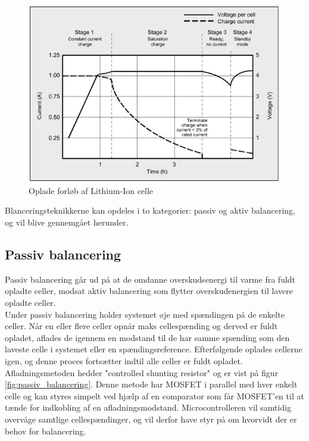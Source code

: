 \begin{figure}[h]
	\centering
	\includegraphics[width=15cm]{billeder/liion_opladning.png}
	\caption{Oplade forløb af Lithium-Ion celle}
	\label{fig:opladning_liion}
\end{figure}

Blanceringsteknikkerne kan opdeles i to kategorier: passiv og aktiv balancering, og vil blive gennemgået herunder.

\subsection{Passiv balancering}
Passiv balancering går ud på at de omdanne overskudsenergi til varme fra fuldt opladte celler, modsat aktiv balancering som flytter overskudenergien til lavere opladte celler.
\\

Under passiv balancering holder systemet øje med spændingen på de enkelte celler. Når en eller flere celler opnår maks cellespænding og derved er fuldt opladet, aflades de igennem en modstand til de har samme spænding som den laveste celle i systemet eller en spændingsreference. Efterfølgende oplades cellerne igen, og denne proces fortsætter indtil alle celler er fuldt opladet. 
\\

Afladningsmetoden hedder "controlled shunting resistor" og er vist på figur \ref{fig:passiv_balancering}. Denne metode har MOSFET i parallel med hver enkelt celle og kan styres simpelt ved hjælp af en comparator som får MOSFET'en til at tænde for indkobling af en afladningsmodstand. Microcontrolleren vil samtidig overvåge samtlige cellespændinger, og vil derfor have styr på om hvorvidt der er behov for balancering.
\\

